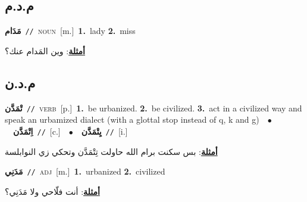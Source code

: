 \documentclass[10pt,a4paper,twoside]{article} %
\begin{document}
\begin{multicols}{2}
\vspace{-3mm}
\subsection*{\color{blue}\foreignlanguage{arabic}{م.د.م}\color{blue}{}} 

{\setlength\topsep{0pt}\textbf{\foreignlanguage{arabic}{مَدَام}}\ {\color{gray}\texttt{//}\color{black}}\ \textsc{noun}\ [m.]\ \textbf{1.}~lady  \textbf{2.}~miss\  \begin{flushright}\color{gray}\foreignlanguage{arabic}{\textbf{\underline{\foreignlanguage{arabic}{أمثلة}}}: وين المَدام عنك؟}\end{flushright}\color{black}} \vspace{2mm}

\vspace{-3mm}
\subsection*{\color{blue}\foreignlanguage{arabic}{م.د.ن}\color{blue}{}} 

{\setlength\topsep{0pt}\textbf{\foreignlanguage{arabic}{تْمَدَّن}}\ {\color{gray}\texttt{//}\color{black}}\ \textsc{verb}\ [p.]\ \textbf{1.}~be urbanized.  \textbf{2.}~be civilized.  \textbf{3.}~act in a civilized way and speak an urbamized dialect (with a glottal stop instead of q, k and g)\ \ $\bullet$\ \ \setlength\topsep{0pt}\textbf{\foreignlanguage{arabic}{اِتْمَدَّن}}\ {\color{gray}\texttt{//}\color{black}}\ [c.]\ \ $\bullet$\ \ \setlength\topsep{0pt}\textbf{\foreignlanguage{arabic}{يِتْمَدَّن}}\ {\color{gray}\texttt{//}\color{black}}\ [i.]\  \begin{flushright}\color{gray}\foreignlanguage{arabic}{\textbf{\underline{\foreignlanguage{arabic}{أمثلة}}}: بس سكنت برام الله حاولت تِتْمَدَّن وتحكي زي النوابلسة}\end{flushright}\color{black}} \vspace{2mm}

{\setlength\topsep{0pt}\textbf{\foreignlanguage{arabic}{مَدَنِي}}\ {\color{gray}\texttt{//}\color{black}}\ \textsc{adj}\ [m.]\ \textbf{1.}~urbanized  \textbf{2.}~civilized\  \begin{flushright}\color{gray}\foreignlanguage{arabic}{\textbf{\underline{\foreignlanguage{arabic}{أمثلة}}}: أنت فلّاحي ولا مَدَنِي؟}\end{flushright}\color{black}} \vspace{2mm}


\end{multicols}
\end{document}
